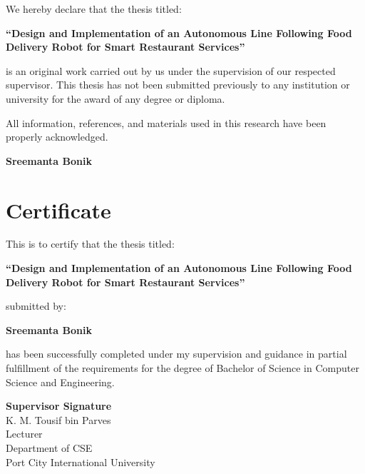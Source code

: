 \documentclass[12pt,a4paper,oneside]{report}
\begin{document}
We hereby declare that the thesis titled:

\begin{center}
\textbf{
“Design and Implementation of an Autonomous Line Following Food Delivery Robot for Smart Restaurant Services”
}
\end{center}

is an original work carried out by us under the supervision of our respected supervisor. This thesis has not been submitted previously to any institution or university for the award of any degree or diploma.

All information, references, and materials used in this research have been properly acknowledged.

\vspace{2cm}

\begin{flushright}
\textbf{Sreemanta Bonik}
\end{flushright}

\newpage


\chapter*{Certificate}

This is to certify that the thesis titled:

\begin{center}
\textbf{
“Design and Implementation of an Autonomous Line Following Food Delivery Robot for Smart Restaurant Services”
}
\end{center}

submitted by:

\vspace{0.5cm}

\textbf{Sreemanta Bonik}

\vspace{0.5cm}

has been successfully completed under my supervision and guidance in partial fulfillment of the requirements for the degree of Bachelor of Science in Computer Science and Engineering.

\vspace{3cm}

\begin{flushright}
\textbf{Supervisor Signature}\\
K. M. Tousif bin Parves\\
Lecturer\\
Department of CSE\\
Port City International University
\end{flushright}
\end{document}
